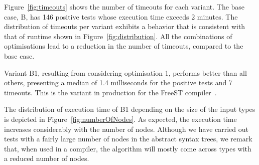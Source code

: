 Figure~\ref{fig:timeouts} shows the number of timeouts for each
variant.  The base case, B, has 146 positive tests whose execution
time exceeds 2 minutes. 
The distribution of timeouts per variant exhibits a behavior that
is consistent 
with that of runtime shown in Figure~\ref{fig:distribution}.
All the combinations of optimisations lead to a reduction in the
number of timeouts, compared to the base case.

Variant B1,
resulting from considering optimisation 1, performs better than all
others, presenting a median of 1.4 milliseconds for the positive tests
and 7 timeouts. This is the variant in production for the FreeST 
compiler~\cite{almeida.etal_freest-functional-language}.

The distribution of execution time of B1 depending on the size of the 
input types is depicted in Figure~\ref{fig:numberOfNodes}.
As expected, the execution time increases considerably with the number of nodes.
%
Although we have carried out tests with a
fairly large number of nodes in the abstract syntax trees, we remark
that, when used in a compiler, the algorithm will mostly come across
types with a reduced number of nodes.



